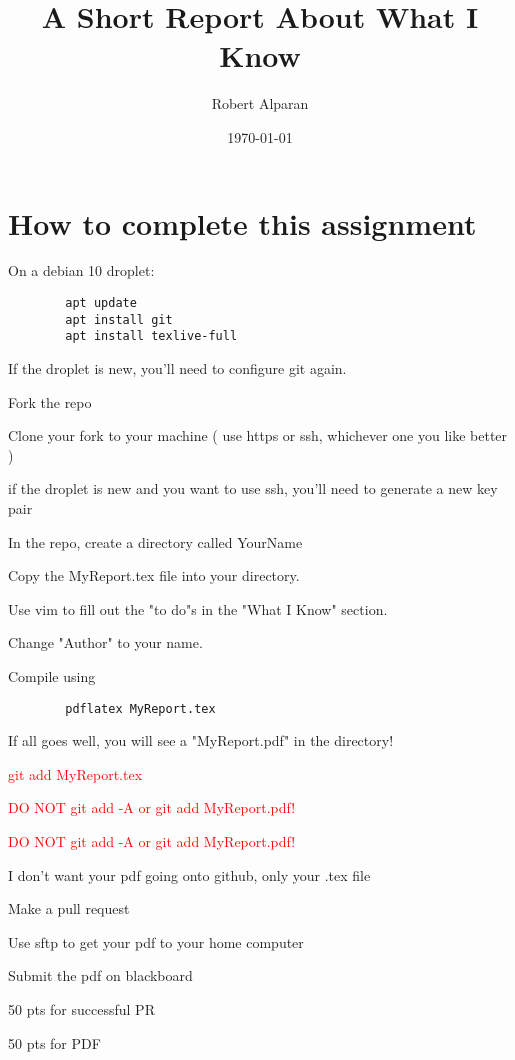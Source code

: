 \documentclass[11pt]{article}
\title{A Short Report About What I Know}
\author{ Robert Alparan }
\date{\today}
\begin{document}
\maketitle	

\section*{How to complete this assignment}
\begin{todolist}
    \item On a debian 10 droplet:
    \begin{verbatim}
        apt update
        apt install git
        apt install texlive-full
    \end{verbatim}
    \item If the droplet is new, you'll need to configure git again.
    \item Fork the repo
    \item Clone your fork to your machine ( use https or ssh, whichever one you like better )
    \item if the droplet is new and you want to use ssh, you'll need to generate a new key pair
    \item In the repo, create a directory called YourName
    \item Copy the MyReport.tex file into your directory.
    \item Use vim to fill out the "to do"s in the "What I Know" section.
    \item Change "Author" to your name.
    \item Compile using
    \begin{verbatim}
        pdflatex MyReport.tex
    \end{verbatim}
    \item If all goes well, you will see a "MyReport.pdf" in the directory!
    \item \textcolor{red}{ git add MyReport.tex}
    \item {\Large\textcolor{red}{ DO NOT git add -A or git add MyReport.pdf!}}
    \item {\LARGE\textcolor{red}{ DO NOT git add -A or git add MyReport.pdf!}}
    \item I don't want your pdf going onto github, only your .tex  file
    \item Make a pull request
    \item Use sftp to get your pdf to your home computer
    \item Submit the pdf on blackboard
    \item 50 pts for successful PR
    \item 50 pts for PDF
\end{todolist}
\end{document}
